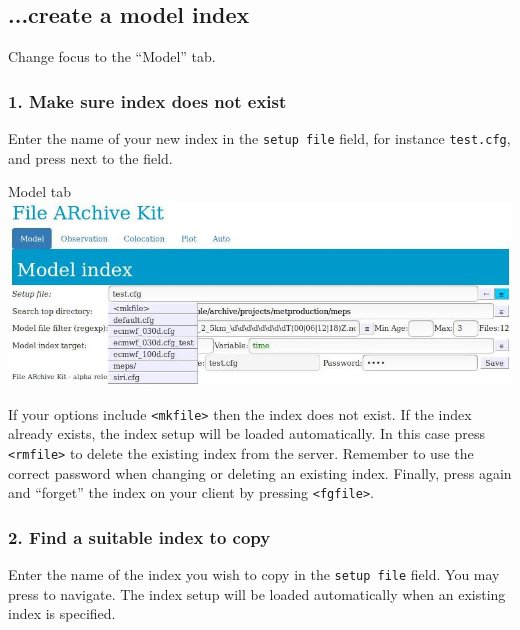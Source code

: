 \documentclass[letterpaper,10pt,twoside,twocolumn,openany]{book}
\begin{document}
\subsection{...create a model index}
Change focus to the ``Model'' tab.
\subsubsection{1. Make sure index does not exist}
Enter the name of your new index in the \lstinline!setup file! field, for instance \lstinline!test.cfg!,
and press   next to the field.
\begin{paperbox}{Model tab}
  \includegraphics[width=\columnwidth]{how_mod.jpg}
\end{paperbox}
If your options include \lstinline!<mkfile>! then the index does not exist.
If the index already exists, the index setup will be loaded automatically.
In this case press \lstinline!<rmfile>! to delete the existing index from the server.
Remember to use the correct password when changing or deleting an existing index.
Finally, press  again and ``forget'' the index on your client by pressing  \lstinline!<fgfile>!.

\subsubsection{2. Find a suitable index to copy}
Enter the name of the index you wish to copy in the \lstinline!setup file! field.
You may press  to navigate.
The index setup will be loaded automatically when an existing index is specified.
\end{document}
